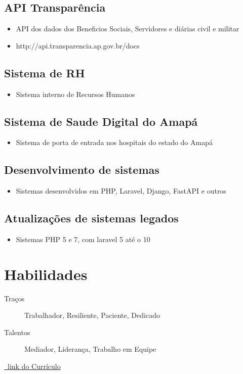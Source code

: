 \documentclass{article}
\begin{document}
\subsection{API Transparência}
\begin{itemize}
  \item API dos dados dos Beneficios Sociais, Servidores e diárias civil e militar
  \item http://api.transparencia.ap.gov.br/docs
\end{itemize}

\subsection{Sistema de RH}
\begin{itemize}
  \item Sistema interno de Recursos Humanos
\end{itemize}

\subsection{Sistema de Saude Digital do Amapá}
\begin{itemize}
  \item Sistema de porta de entrada nos hospitais do estado do Amapá
\end{itemize}

\subsection{Desenvolvimento de sistemas}
\begin{itemize}
  \item Sistemas desenvolvidos em PHP, Laravel, Django, FastAPI e outros 
\end{itemize}

\subsection{Atualizações de sistemas legados}
\begin{itemize}
  \item Sistemas PHP 5 e 7, com laravel 5 até o 10
\end{itemize}



\section{\faCogs\enspace Habilidades}
\begin{description}
  \item[Traços] Trabalhador, Resiliente, Paciente, Dedicado
  \item[Talentos] Mediador, Liderança, Trabalho em Equipe 
\end{description}

\href{https://github.com/PedroPaulo-98/Curriculo}{\faGithub\ link do Currículo}
\end{document}
